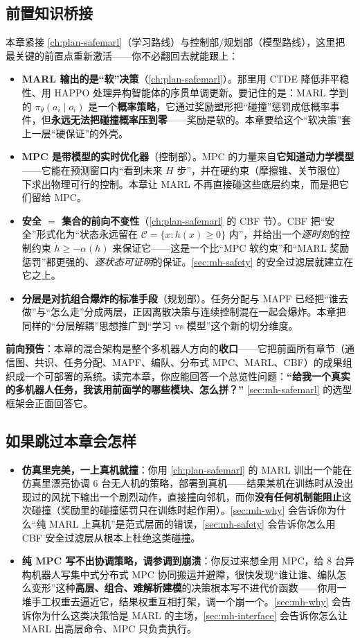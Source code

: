 \subsection*{前置知识桥接}
本章紧接 \cref{ch:plan-safemarl}（学习路线）与控制部/规划部（模型路线），这里把最关键的前置点重新激活——你不必翻回去就能跟上：
\begin{itemize}
  \item \textbf{MARL 输出的是“软”决策}（\cref{ch:plan-safemarl}）。那里用 CTDE 降低非平稳性、用 HAPPO 处理异构智能体的序贯单调更新。要记住的是：MARL 学到的 $\pi_\theta(a_i\mid o_i)$ 是一个\textbf{概率策略}，它通过奖励塑形把“碰撞”惩罚成低概率事件，但\textbf{永远无法把碰撞概率压到零}——奖励是软的。本章要给这个“软决策”套上一层“硬保证”的外壳。
  \item \textbf{MPC 是带模型的实时优化器}（控制部）。MPC 的力量来自\textbf{它知道动力学模型}——它能在预测窗口内“看到未来 $H$ 步”，并在硬约束（摩擦锥、关节限位）下求出物理可行的控制。本章让 MARL 不再直接碰这些底层约束，而是把它们留给 MPC。
  \item \textbf{安全 $=$ 集合的前向不变性}（\cref{ch:plan-safemarl} 的 CBF 节）。CBF 把“安全”形式化为“状态永远留在 $\mathcal{C}=\{x:h(x)\ge0\}$ 内”，并给出一个\emph{逐时刻}的控制约束 $\dot h\ge-\alpha(h)$ 来保证它——这是一个比“MPC 软约束”和“MARL 奖励惩罚”都更强的、\emph{逐状态可证明}的保证。\cref{sec:mh-safety} 的安全过滤层就建立在它之上。
  \item \textbf{分层是对抗组合爆炸的标准手段}（规划部）。任务分配与 MAPF 已经把“谁去做”与“怎么走”分成两层，正因离散决策与连续控制混在一起会爆炸。本章把同样的“分层解耦”思想推广到“学习 vs 模型”这个新的切分维度。
\end{itemize}

\textbf{前向预告}：本章的混合架构是整个多机器人方向的\textbf{收口}——它把前面所有章节（通信图、共识、任务分配、MAPF、编队、分布式 MPC、MARL、CBF）的成果组织成一个可部署的系统。读完本章，你应能回答一个总览性问题：\textbf{“给我一个真实的多机器人任务，我该用前面学的哪些模块、怎么拼？”} \cref{sec:mh-safemarl} 的选型框架会正面回答它。

\subsection*{如果跳过本章会怎样}
\begin{itemize}
  \item \textbf{仿真里完美，一上真机就撞}：你用 \cref{ch:plan-safemarl} 的 MARL 训出一个能在仿真里漂亮协调 $6$ 台无人机的策略，部署到真机——结果某机在训练时从没出现过的风扰下输出一个剧烈动作，直接撞向邻机，而你\textbf{没有任何机制能阻止}这次碰撞（奖励里的碰撞惩罚只在训练时起作用）。\cref{sec:mh-why} 会告诉你为什么“纯 MARL 上真机”是范式层面的错误，\cref{sec:mh-safety} 会告诉你怎么用 CBF 安全过滤层从根本上杜绝这类碰撞。
  \item \textbf{纯 MPC 写不出协调策略，调参调到崩溃}：你反过来想全用 MPC，给 $8$ 台异构机器人写集中式分布式 MPC 协同搬运并避障，很快发现“谁让谁、编队怎么变形”这种\textbf{高层、组合、难解析建模}的决策根本写不进代价函数——你用一堆手工权重去逼近它，结果权重互相打架，调一个崩一个。\cref{sec:mh-why} 会告诉你为什么这类决策恰是 MARL 的主场，\cref{sec:mh-interface} 会告诉你怎么让 MARL 出高层命令、MPC 只负责执行。
\end{itemize}

